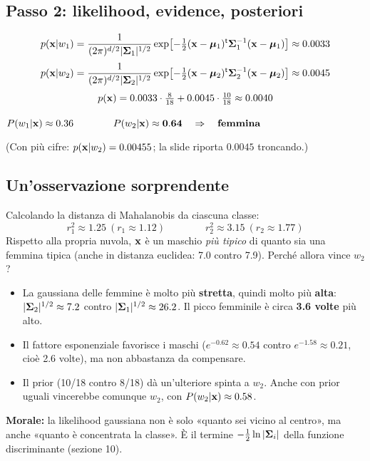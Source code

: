 \subsection{Passo 2: likelihood, evidence, posteriori}
\begin{esempio}[Prior come nella sezione 4: $P(w_1)=8/18$, $P(w_2)=10/18$]
\[
p(\mathbf{x}|w_1)=\frac{1}{(2\pi)^{d/2}|\bm{\Sigma}_1|^{1/2}}\exp\!\left[-\tfrac12(\mathbf{x}-\bm{\mu}_1)^{\mathsf{t}}\bm{\Sigma}_1^{-1}(\mathbf{x}-\bm{\mu}_1)\right]\approx0.0033
\]
\[
p(\mathbf{x}|w_2)=\frac{1}{(2\pi)^{d/2}|\bm{\Sigma}_2|^{1/2}}\exp\!\left[-\tfrac12(\mathbf{x}-\bm{\mu}_2)^{\mathsf{t}}\bm{\Sigma}_2^{-1}(\mathbf{x}-\bm{\mu}_2)\right]\approx0.0045
\]
\[
p(\mathbf{x})=0.0033\cdot\tfrac{8}{18}+0.0045\cdot\tfrac{10}{18}\approx0.0040
\]
\begin{center}
\begin{tcolorbox}[enhanced,width=.8\linewidth,colback=white,colframe=rosso,boxrule=1.2pt,arc=4pt,halign=flush center]
$P(w_1|\mathbf{x})\approx0.36\qquad\qquad P(w_2|\mathbf{x})\approx\mathbf{0.64}\quad\Rightarrow\quad\text{\textbf{femmina}}$
\end{tcolorbox}
\end{center}
(Con più cifre: $p(\mathbf{x}|w_2)=0.00455$; la slide riporta $0.0045$ troncando.)
\end{esempio}


\subsection{Un'osservazione sorprendente}
\begin{intuizione}
Calcolando la distanza di Mahalanobis da ciascuna classe:
\[
r_1^2\approx1.25\ (r_1\approx1.12)\qquad\qquad r_2^2\approx3.15\ (r_2\approx1.77)
\]
Rispetto alla propria nuvola, $\mathbf{x}$ è un maschio \emph{più tipico} di quanto sia una femmina tipica (anche in distanza euclidea: 7.0 contro 7.9). Perché allora vince $w_2$?
\begin{itemize}
  \item La gaussiana delle femmine è molto più \textbf{stretta}, quindi molto più \textbf{alta}: $|\bm{\Sigma}_2|^{1/2}\approx7.2$ contro $|\bm{\Sigma}_1|^{1/2}\approx26.2$. Il picco femminile è circa \textbf{3.6 volte} più alto.
  \item Il fattore esponenziale favorisce i maschi ($e^{-0.62}\approx0.54$ contro $e^{-1.58}\approx0.21$, cioè 2.6 volte), ma non abbastanza da compensare.
  \item Il prior (10/18 contro 8/18) dà un'ulteriore spinta a $w_2$. Anche con prior uguali vincerebbe comunque $w_2$, con $P(w_2|\mathbf{x})\approx0.58$.
\end{itemize}
\textbf{Morale:} la likelihood gaussiana non è solo «quanto sei vicino al centro», ma anche «quanto è concentrata la classe». È il termine $-\frac12\ln|\bm{\Sigma}_i|$ della funzione discriminante (sezione 10).
\end{intuizione}

